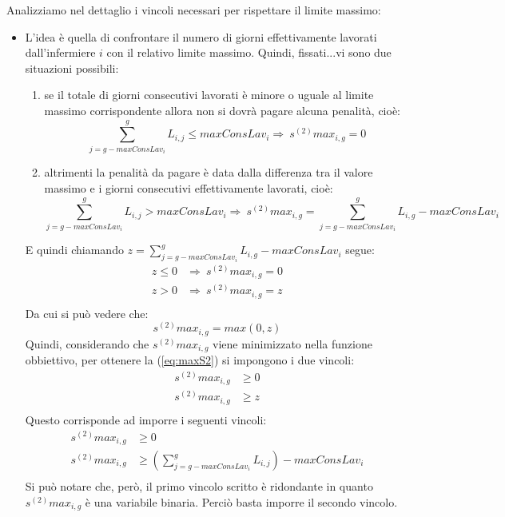 Analizziamo nel dettaglio i vincoli necessari per rispettare il limite massimo:
\begin{itemize}

\item L'idea è quella di confrontare il numero di giorni effettivamente lavorati dall'infermiere $i$ con il relativo limite massimo. Quindi, fissati...vi sono due situazioni possibili:
\begin{enumerate}
\item  se il totale di giorni consecutivi lavorati è minore o uguale al limite massimo corrispondente allora non si dovrà pagare alcuna penalità, cioè:
\begin{equation}
\sum_{j=g-maxConsLav_i}^g L_{i, j} \leq maxConsLav_i \Longrightarrow\ s^{(2)}max_{i, g} = 0
\end{equation}
\item altrimenti la penalità da pagare è data dalla differenza tra il valore massimo e i giorni consecutivi effettivamente lavorati, cioè:
\begin{equation}
\sum_{j=g-maxConsLav_i}^g L_{i, j} > maxConsLav_i \Longrightarrow\ s^{(2)}max_{i, g} = \sum_{j=g-maxConsLav_i}^g L_{i, g} - maxConsLav_i
\end{equation}
\end{enumerate}
E quindi chiamando $ z = \sum_{j=g-maxConsLav_i}^g L_{i, g} - maxConsLav_i$ segue:
\begin{equation}
\begin{split}
z \leq 0 &\Longrightarrow\ s^{(2)}max_{i, g} = 0 \\
z > 0 &\Longrightarrow\ s^{(2)}max_{i, g} = z \\
\end{split}
\end{equation}
Da cui si può vedere che:
\begin{equation}
\label{eq:maxS2}
s^{(2)}max_{i, g} = max(0, z)
\end{equation}
Quindi, considerando che $s^{(2)}max_{i, g}$ viene minimizzato nella funzione obbiettivo, per ottenere la (\ref{eq:maxS2}) si impongono i due vincoli:
\begin{equation}
\begin{split}
s^{(2)}max_{i, g} &\geq 0 \\
s^{(2)}max_{i, g} &\geq z \\
\end{split}
\end{equation}
Questo corrisponde ad imporre i seguenti vincoli:
\begin{equation}
\begin{split}
s^{(2)}max_{i, g} &\geq 0\\
s^{(2)}max_{i, g} &\geq (\sum_{j=g-maxConsLav_i}^g L_{i, j}) - maxConsLav_i\\
\end{split}
\end{equation}
Si può notare che, però, il primo vincolo scritto è ridondante in quanto $s^{(2)}max_{i, g}$ è una variabile binaria. Perciò basta imporre il secondo vincolo.


\end{itemize}
